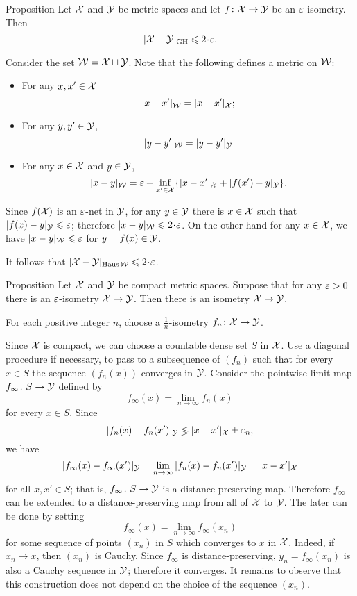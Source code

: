 \begin{thm}{Proposition}\label{prop:alm-isom=>GH}
Let $\mathcal{X}$ and $\mathcal{Y}$ be metric spaces 
and let $f\colon \mathcal{X}\to \mathcal{Y}$ be an $\varepsilon$-isometry.
Then 
\[|\spc{X}-\spc{Y}|_{\GH}\le 2\cdot \eps.\]
\end{thm}

 Consider the set $\mathcal{W}=\mathcal{X}\sqcup \mathcal{Y}$.
Note that the following defines a metric on $\mathcal{W}$:
\begin{itemize}
\item  For any $x,x'\in \mathcal{X}$
$$|x-x'|_{\mathcal{W}}=|x-x'|_{\mathcal{X}};$$
\item For any $y,y'\in \mathcal{Y}$,
$$|y-y'|_{\mathcal{W}}=|y-y'|_{\mathcal{Y}}$$
\item For any $x\in \mathcal{X}$ and $y\in \mathcal{Y}$,
$$|x-y|_{\mathcal{W}}=\varepsilon+\inf_{x'\in \mathcal{X}}\{|x-x'|_{\mathcal{X}}+|f(x')-y|_{\mathcal{Y}}\}.$$
\end{itemize}

Since $f(\mathcal{X})$ is an $\varepsilon$-net in $\mathcal{Y}$,
for any $y\in \mathcal{Y}$ there is $x\in \mathcal{X}$ such that $|f(x)-y|_{\spc{Y}}\z\le\eps$;
therefore $|x-y|_{\spc{W}}\le 2\cdot\eps$.
On the other hand for any $x\in \mathcal{X}$, we have $|x-y|_{\mathcal{W}}\leqslant\varepsilon$
for $y=f(x)\in \mathcal{Y}$.

It follows that $|\spc{X}-\spc{Y}|_{\Haus\spc{W}}\le 2\cdot\eps$.
\qedsf

\begin{thm}{Proposition}\label{prop:eps-isometry=isometry}
Let $\mathcal{X}$ and $\mathcal{Y}$ be compact metric spaces.
Suppose that for any $\varepsilon>0$ there is an $\varepsilon$-isometry $\mathcal{X}\to\mathcal{Y}$.
Then there is an isometry $\mathcal{X}\to\mathcal{Y}$.
\end{thm}

For each positive integer $n$, choose a $\tfrac1n$-isometry $f_n\colon\mathcal{X}\to\mathcal{Y}$.

Since $\mathcal{X}$ is compact, 
we can choose a countable dense set
$S$ in $\mathcal{X}$.
Use a diagonal procedure if necessary, to pass to a subsequence of $(f_n)$
such that for every $x \in S$ the sequence $(f_n(x))$ 
converges in $\mathcal{Y}$. 
Consider the pointwise limit map  $f_\infty \colon S \to \mathcal{Y}$ defined by
 $$f_\infty(x) = \lim_{n\to\infty} f_n (x)$$ for every $x \in S$. 
Since $$|f_n (x)- f_n (x')|_{\mathcal{Y}}\lessgtr |x- x'|_{\mathcal{X}} \pm\varepsilon_n,$$ 
we have 
$$|f_\infty(x)-f_\infty (x')|_{\mathcal{Y}} 
= \lim_{n\to\infty} |f_n(x)-f_n (x')|_{\mathcal{Y}} 
= |x -x'|_{\mathcal{X}}$$ for all
$x, x' \in S$; 
that is, $f_\infty\colon S\to \mathcal{Y}$ is a distance-preserving map. 
Therefore $f_\infty$ can be extended to a distance-preserving map from all of $\mathcal{X}$ to $\mathcal{Y}$.
The later can be done by setting 
$$f_\infty(x)=\lim_{n\to\infty} f_\infty(x_n)$$ 
for some sequence of points $(x_n)$ in $S$
which converges to $x$ in $\mathcal{X}$.
Indeed, if $x_n\to x$, then $(x_n)$ is Cauchy.
Since $f_\infty$ is distance-preserving, $y_n=f_\infty(x_n)$ is also a Cauchy sequence in $\mathcal{Y}$;
therefore it converges.
It remains to observe that this construction does not depend on the choice of the sequence $(x_n)$.

